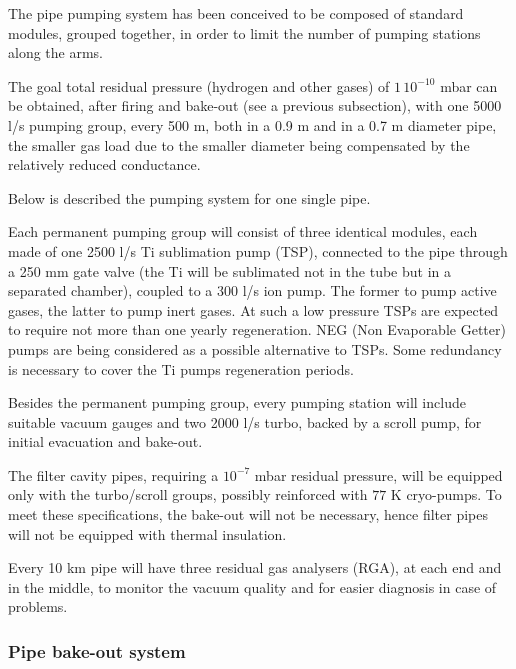 The pipe pumping system has been conceived to be composed of standard modules, grouped together, in order to limit the number of pumping stations along the arms.

The goal total residual pressure (hydrogen and other gases) of $1\,10^{-10}$ mbar can be obtained, after firing and bake-out (see a previous subsection), with one 5000 l/s pumping group, every 500 m, both in a 0.9 m and in a 0.7 m diameter  pipe, the smaller gas load due to the smaller diameter being compensated by the relatively reduced conductance.

Below is described the pumping system for one single pipe.

Each permanent pumping group will consist of three identical modules, each made of one 2500 l/s Ti sublimation pump (TSP), connected to the pipe through a 250 mm gate valve (the Ti will be sublimated not in the tube but in a separated chamber), coupled to a 300 l/s ion pump. The former to pump active gases, the latter to pump inert gases. At such a low pressure TSPs are expected to require not more than one yearly regeneration. NEG (Non Evaporable Getter) pumps are being considered as a possible alternative to TSPs. Some redundancy is necessary to cover the Ti pumps regeneration periods.

Besides the permanent pumping group, every pumping station will include suitable vacuum gauges and two 2000 l/s turbo, backed by a scroll pump, for initial evacuation and bake-out.

The filter cavity pipes, requiring a $10^{-7}$ mbar residual pressure, will be equipped only with the turbo/scroll groups, possibly reinforced with $77$ K cryo-pumps. To meet these specifications, the bake-out will not be necessary, hence filter pipes will not be equipped with thermal insulation.

Every 10 km pipe will have three residual gas analysers (RGA), at each end and in the middle, to monitor the vacuum quality and for easier diagnosis in case of problems.

\subsubsection{Pipe bake-out system}

